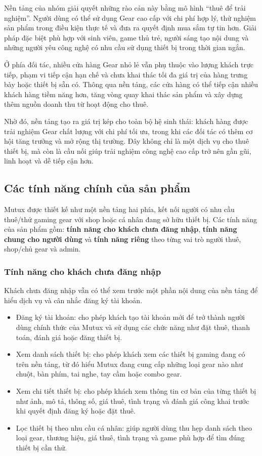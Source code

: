     Nền tảng của nhóm giải quyết những rào cản này bằng mô hình ``thuê để trải nghiệm''. Người dùng có thể sử dụng Gear cao cấp với chi phí hợp lý, thử nghiệm sản phẩm trong điều kiện thực tế và đưa ra quyết định mua sắm tự tin hơn. Giải pháp đặc biệt phù hợp với sinh viên, game thủ trẻ, người sáng tạo nội dung và những người yêu công nghệ có nhu cầu sử dụng thiết bị trong thời gian ngắn.

    Ở phía đối tác, nhiều cửa hàng Gear nhỏ lẻ vẫn phụ thuộc vào lượng khách trực tiếp, phạm vi tiếp cận hạn chế và chưa khai thác tối đa giá trị của hàng trưng bày hoặc thiết bị sẵn có. Thông qua nền tảng, các cửa hàng có thể tiếp cận nhiều khách hàng tiềm năng hơn, tăng vòng quay khai thác sản phẩm và xây dựng thêm nguồn doanh thu từ hoạt động cho thuê.

    Nhờ đó, nền tảng tạo ra giá trị kép cho toàn bộ hệ sinh thái: khách hàng được trải nghiệm Gear chất lượng với chi phí tối ưu, trong khi các đối tác có thêm cơ hội tăng trưởng và mở rộng thị trường. Đây không chỉ là một dịch vụ cho thuê thiết bị, mà còn là cầu nối giúp trải nghiệm công nghệ cao cấp trở nên gần gũi, linh hoạt và dễ tiếp cận hơn.

\subsection{Các tính năng chính của sản phẩm}

Mutux được thiết kế như một nền tảng hai phía, kết nối người có nhu cầu thuê/thử gaming gear với shop hoặc cá nhân đang sở hữu thiết bị. Các tính năng của sản phẩm gồm: \textbf{tính năng cho khách chưa đăng nhập}, \textbf{tính năng chung cho người dùng} và \textbf{tính năng riêng} theo từng vai trò người thuê, shop/chủ gear và admin.
\subsubsection{Tính năng cho khách chưa đăng nhập}

Khách chưa đăng nhập vẫn có thể xem trước một phần nội dung của nền tảng để hiểu dịch vụ và cân nhắc đăng ký tài khoản.

\begin{itemize}
    \item Đăng ký tài khoản: cho phép khách tạo tài khoản mới để trở thành người dùng chính thức của Mutux và sử dụng các chức năng như đặt thuê, thanh toán, đánh giá hoặc đăng thiết bị.
    \item Xem danh sách thiết bị: cho phép khách xem các thiết bị gaming đang có trên nền tảng, từ đó hiểu Mutux đang cung cấp những loại gear nào như chuột, bàn phím, tai nghe, tay cầm hoặc combo gear.
    \item Xem chi tiết thiết bị: cho phép khách xem thông tin cơ bản của từng thiết bị như ảnh, mô tả, thông số, giá thuê, tình trạng và đánh giá công khai trước khi quyết định đăng ký hoặc đặt thuê.
    \item Lọc thiết bị theo nhu cầu cá nhân: giúp người dùng thu hẹp danh sách theo loại gear, thương hiệu, giá thuê, tình trạng và game phù hợp để tìm đúng thiết bị cần thử.
\end{itemize}
